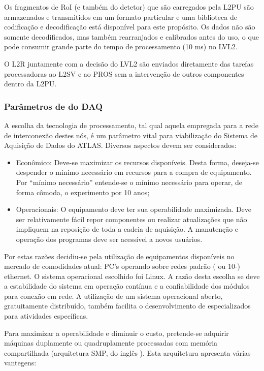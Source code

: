 Os fragmentos de RoI (e também do detetor) que são carregados pela L2PU são
armazenados e transmitidos em um formato particular e uma biblioteca de
codificação e decodificação \cite{aa:ef-urd, aa:ef-ooad} está disponível para
este propósito. Os dados não são somente decodificados, mas também
rearranjados e calibrados antes do uso, o que pode consumir grande parte do
tempo de processamento (10 ms) no LVL2.

O L2R juntamente com a decisão do LVL2 são enviados diretamente das tarefas
processadoras ao L2SV e ao PROS sem a intervenção de outros componentes dentro
da L2PU.

\subsubsection{Parâmetros de  do DAQ}

A escolha da tecnologia de processamento, tal qual aquela empregada para a
rede de interconexão destes nós, é um parâmetro vital para viabilização do
Sistema de Aquisição de Dados do ATLAS. Diversos aspectos devem ser
considerados:

\begin{itemize}
\item Econômico: Deve-se maximizar os recursos disponíveis. Desta forma,
deseja-se despender o mínimo necessário em recursos para a compra de
equipamento. Por ``mínimo necessário'' entende-se o mínimo necessário para
operar, de forma cômoda, o experimento por 10 anos;

\item Operacionais: O equipamento deve ter sua operabilidade maximizada. Deve
ser relativamente fácil repor componentes ou realizar atualizações que não
impliquem na reposição de toda a cadeia de aquisição. A manutenção e operação
dos programas deve ser acessível a novos usuários.
\end{itemize}

Por estas razões decidiu-se pela utilização de equipamentos disponíveis no
mercado de comodidades atual: PC's operando sobre redes padrão (
ou 10-) ethernet. O sistema operacional escolhido foi Linux. A
razão desta escolha se deve a estabilidade do sistema em operação contínua e a
confiabilidade dos módulos para conexão em rede. A utilização de um sistema
operacional aberto, gratuitamente distribuído, também facilita o
desenvolvimento de  especializados para atividades específicas.

Para maximizar a operabilidade e diminuir o custo, pretende-se adquirir
máquinas duplamente ou quadruplamente processadas com memória compartilhada
(arquitetura SMP, do inglês ). Esta arquitetura
apresenta várias vantegens:

